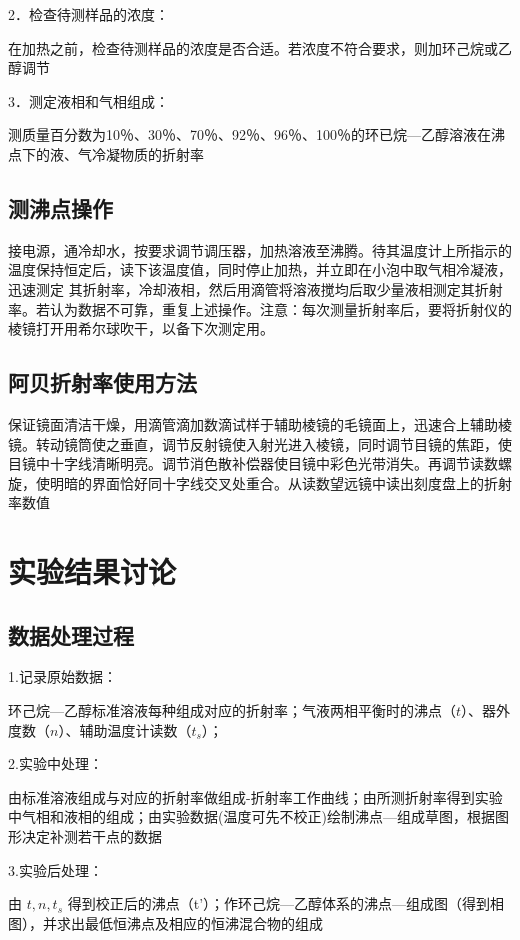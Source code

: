 \documentclass[4pt,a4papper]{article}
\begin{document}
2．检查待测样品的浓度：

在加热之前，检查待测样品的浓度是否合适。若浓度不符合要求，则加环己烷或乙醇调节

3．测定液相和气相组成：

测质量百分数为10％、30％、70％、92％、96％、100％的环已烷—乙醇溶液在沸点下的液、气冷凝物质的折射率

\subsection{测沸点操作}
接电源，通冷却水，按要求调节调压器，加热溶液至沸腾。待其温度计上所指示的温度保持恒定后，读下该温度值，同时停止加热，并立即在小泡中取气相冷凝液，迅速测定 
其折射率，冷却液相，然后用滴管将溶液搅均后取少量液相测定其折射率。若认为数据不可靠，重复上述操作。注意：每次测量折射率后，要将折射仪的棱镜打开用希尔球吹干，以备下次测定用。

\subsection{阿贝折射率使用方法}
保证镜面清洁干燥，用滴管滴加数滴试样于辅助棱镜的毛镜面上，迅速合上辅助棱镜。转动镜筒使之垂直，调节反射镜使入射光进入棱镜，同时调节目镜的焦距，使目镜中十字线清晰明亮。调节消色散补偿器使目镜中彩色光带消失。再调节读数螺旋，使明暗的界面恰好同十字线交叉处重合。从读数望远镜中读出刻度盘上的折射率数值


\section{实验结果讨论}
\subsection{数据处理过程}
1.记录原始数据：

环己烷—乙醇标准溶液每种组成对应的折射率；气液两相平衡时的沸点（$t$）、器外度数（$n$）、辅助温度计读数（$t_s$）；

2.实验中处理：

由标准溶液组成与对应的折射率做组成-折射率工作曲线；由所测折射率得到实验中气相和液相的组成；由实验数据(温度可先不校正)绘制沸点—组成草图，根据图形决定补测若干点的数据
 
3.实验后处理：

由 $t, n, t_s$ 得到校正后的沸点（t'）；作环己烷—乙醇体系的沸点—组成图（得到相图），并求出最低恒沸点及相应的恒沸混合物的组成

\newpage
\end{document}
